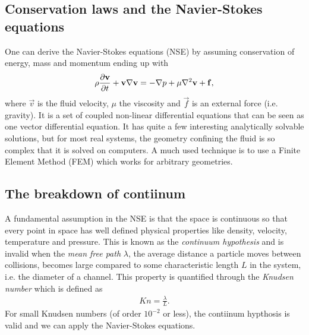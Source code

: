 \subsection{Conservation laws and the Navier-Stokes equations}
One can derive the Navier-Stokes equations (NSE) by assuming conservation of energy, mass and momentum ending up with\cite{batchelor2000introduction}
\begin{align}
	\rho \frac{\partial \mathbf v}{\partial t} + \mathbf v\nabla\mathbf v = -\nabla p + \mu\nabla^2\mathbf v + \mathbf f,
\end{align}
where $\vec v$ is the fluid velocity, $\mu$ the viscosity and $\vec f$ is an external force (i.e. gravity). It is a set of coupled non-linear differential equations that can be seen as one vector differential equation. It has quite a few interesting analytically solvable solutions, but for most real systems, the geometry confining the fluid is so complex that it is solved on computers. A much used technique is to use a Finite Element Method (FEM) which works for arbitrary geometries. 

\subsection{The breakdown of contiinum}
A fundamental assumption in the NSE is that the space is continuous so that every point in space has well defined physical properties like density, velocity, temperature and pressure. This is known as the \textit{continuum hypothesis} and is invalid when the \textit{mean free path} $\lambda$, the average distance a particle moves between collisions, becomes large compared to some characteristic length $L$ in the system, i.e. the diameter of a channel. This property is quantified through the \textit{Knudsen number} which is defined as
\begin{align}
	Kn = \frac{\lambda}{L}.
\end{align}
For small Knudsen numbers (of order $10^{-2}$ or less), the contiinum hypthosis is valid and we can apply the Navier-Stokes equations\cite{karniadakis2005microflows}.
